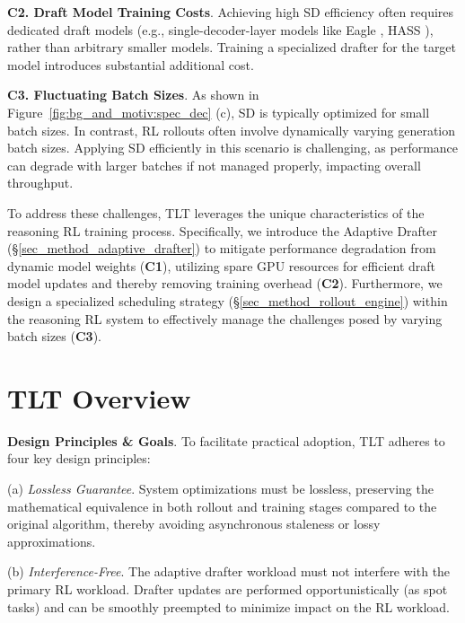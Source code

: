 \documentclass[sigplan,screen]{acmart}
\newcommand{\SysName}{\textrm{TLT}\xspace}
\begin{document}
\textbf{C2. Draft Model Training Costs}. 
Achieving high SD efficiency often requires dedicated draft models (e.g., single-decoder-layer models like Eagle \cite{Eagle1}, HASS \cite{HASS}), rather than arbitrary smaller models. Training a specialized drafter for the target model introduces substantial additional cost.



\textbf{C3. Fluctuating Batch Sizes}. 
As shown in Figure~\ref{fig:bg_and_motiv:spec_dec} (c), SD is typically optimized for small batch sizes. In contrast, RL rollouts often involve dynamically varying generation batch sizes. Applying SD efficiently in this scenario is challenging, as performance can degrade with larger batches if not managed properly, impacting overall throughput.

To address these challenges, \SysName leverages the unique characteristics of the reasoning RL training process. Specifically, we introduce the Adaptive Drafter (\S \ref{sec_method_adaptive_drafter}) to mitigate performance degradation from dynamic model weights (\textbf{C1}), utilizing spare GPU resources for efficient draft model updates and thereby removing training overhead (\textbf{C2}). Furthermore, we design a specialized scheduling strategy (\S \ref{sec_method_rollout_engine}) within the reasoning RL system to effectively manage the challenges posed by varying batch sizes (\textbf{C3}).


\vspace{-10pt}

\section{\SysName Overview}
\label{sec_sys_overview}




\noindent\textbf{Design Principles \& Goals}.
To facilitate practical adoption, \SysName adheres to four key design principles:

\noindent(a) \emph{Lossless Guarantee}. System optimizations must be lossless, preserving the mathematical equivalence in both rollout and training stages compared to the original algorithm, thereby avoiding asynchronous staleness or lossy approximations.

\noindent(b) \emph{Interference-Free}. The adaptive drafter workload must not interfere with the primary RL workload. Drafter updates are performed opportunistically (as spot tasks) and can be smoothly preempted to minimize impact on the RL workload.
\end{document}
